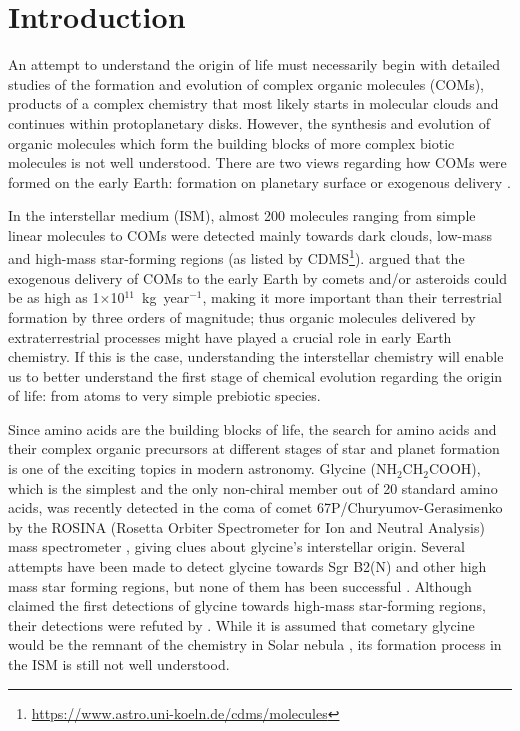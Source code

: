 \documentclass{aastex61}
\begin{document}

\section{Introduction}
An attempt to understand the origin of life must necessarily begin with detailed studies of the formation and evolution of complex organic molecules (COMs), products of a complex chemistry that most likely starts in molecular clouds and continues within protoplanetary disks.
%
However, the synthesis and evolution of organic molecules which form the building blocks of more complex biotic molecules is not well understood.
%
There are two views regarding how COMs were formed on the early Earth: formation on planetary surface or exogenous delivery \citep{Ehrenfreund02}. 

%
In the interstellar medium (ISM), almost 200 molecules ranging from simple linear molecules to COMs were detected mainly towards dark clouds, low-mass and high-mass star-forming regions (as listed by CDMS\footnote{\url{https://www.astro.uni-koeln.de/cdms/molecules}}).
%
\cite{Ehrenfreund02} argued that the exogenous delivery of COMs to the early Earth by comets and/or asteroids could be as high as 1$\times$10$^{11}$~kg~year$^{-1}$, making it more important than their terrestrial formation by three orders of magnitude; thus organic molecules delivered by extraterrestrial processes might have played a crucial role in early Earth chemistry.
%
If this is the case, understanding the interstellar chemistry will enable us to better understand the first stage of chemical evolution regarding the origin of life: from atoms to very simple prebiotic species.


%
Since amino acids are the building blocks of life, the search for amino acids and their complex organic precursors at different stages of star and planet formation is one of the exciting topics in modern astronomy. 
Glycine (NH$_2$CH$_2$COOH), which is the simplest and the only non-chiral member out of 20 standard amino acids, was recently detected in the coma of comet 67P/Churyumov-Gerasimenko by the ROSINA (Rosetta Orbiter Spectrometer for Ion and Neutral Analysis) mass spectrometer \citep{Altwegg16}, giving clues about glycine's interstellar origin.
%
Several attempts have been made to detect glycine towards Sgr B2(N) and other high mass star forming regions, but none of them has been successful \cite[e.g.,][]{Ceccarelli00}.
%
Although \cite{Kuan03} claimed the first detections of glycine towards high-mass star-forming regions, their detections were refuted by \cite{Snyder05}.
%
While it is assumed that cometary glycine would be the remnant of the chemistry in Solar nebula \citep{Walsh14}, its formation process in the ISM is still not well understood.
% 
\end{document}
